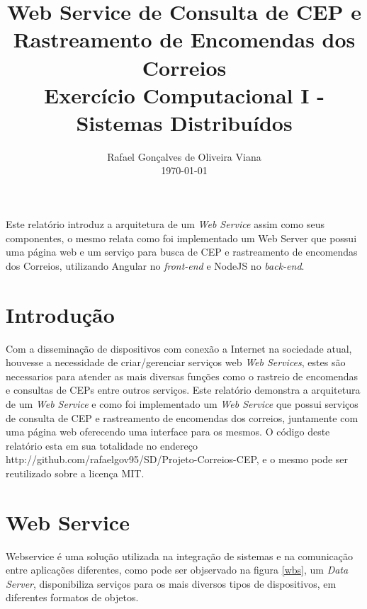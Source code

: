 \documentclass[12pt]{article}
\title{Web Service de Consulta de CEP e Rastreamento de Encomendas dos Correios  \\ Exercício Computacional I - Sistemas Distribuídos}
\author{Rafael Gonçalves de Oliveira Viana\inst{1} \\\vspace*{10pt} \normalsize  \today{} }
\begin{document}
 

\maketitle

     
\begin{resumo} 	
  Este relatório introduz a arquitetura de um \textit{Web Service} assim como seus componentes, o mesmo relata como foi implementado um Web Server que possui uma página web e um serviço para busca de CEP e rastreamento de encomendas dos Correios, utilizando Angular no \textit{front-end} e NodeJS no \textit{back-end}.
\end{resumo}



\section{Introdução}
  Com a disseminação de dispositivos com conexão a Internet na sociedade atual, houvesse a necessidade de criar/gerenciar serviços web \textit{Web Services}, estes são necessarios para atender as mais diversas funções como o rastreio de encomendas e consultas de CEPs entre outros serviços.
  Este relatório demonstra a arquitetura de um \textit{Web Service} e como foi implementado um \textit{Web Service} que possui serviços de consulta de CEP e rastreamento de encomendas dos correios, juntamente com uma página web oferecendo uma interface para os mesmos.
  O código deste relatório esta em sua totalidade no endereço http://github.com/rafaelgov95/SD/Projeto-Correios-CEP, e o mesmo pode ser reutilizado sobre a licença MIT.
\section{Web Service}
Webservice é uma solução utilizada na integração de sistemas e na comunicação entre aplicações diferentes, como pode ser objservado na figura \ref{wbs}, um \textit{Data Server}, disponibiliza serviços para os mais diversos tipos de dispositivos, em diferentes formatos de objetos.
\end{document}
